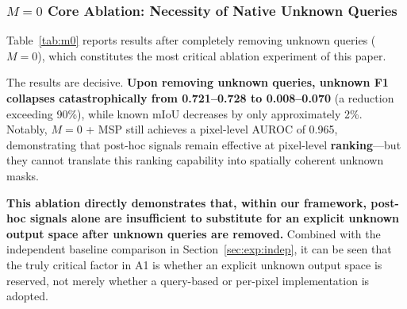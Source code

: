 \documentclass[journal]{IEEEtai}
\begin{document}
\subsubsection{\texorpdfstring{$M=0$}{M=0} Core Ablation: Necessity of Native Unknown Queries}\label{sec:exp:ablation:m0}

Table~\ref{tab:m0} reports results after completely removing unknown queries ($M=0$),
which constitutes the most critical ablation experiment of this paper.

\begin{table}[t]
\centering
\footnotesize
\setlength{\tabcolsep}{3pt}
\caption{\texorpdfstring{$M=0$}{M=0} ablation: can post-hoc signals substitute for structured abstention
after removing native unknown queries?
Synapse A1 protocol. `\texttt{---}' indicates the metric is not applicable or not
reported for that setting.}\label{tab:m0}
\end{table}

The results are decisive.
\textbf{Upon removing unknown queries, unknown F1 collapses catastrophically from
0.721--0.728 to 0.008--0.070} (a reduction exceeding 90\%), while known mIoU
decreases by only approximately 2\%.
Notably, $M=0$ + MSP still achieves a pixel-level AUROC of 0.965, demonstrating
that post-hoc signals remain effective at pixel-level \textbf{ranking}---but they
cannot translate this ranking capability into spatially coherent unknown masks.

\textbf{This ablation directly demonstrates that, within our framework, post-hoc
signals alone are insufficient to substitute for an explicit unknown output space
after unknown queries are removed.}
Combined with the independent baseline comparison in Section~\ref{sec:exp:indep},
it can be seen that the truly critical factor in A1 is whether an explicit unknown
output space is reserved, not merely whether a query-based or per-pixel implementation
is adopted.
\end{document}
